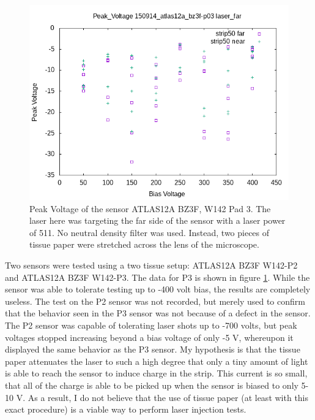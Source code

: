 \documentclass{report}
\begin{document}
            \begin{figure}[h] 
                \includegraphics[height=.4\textheight]{Peak_Voltage__150914_atlas12a_bz3f-p03__laser_far}
                \centering
                \caption{ Peak Voltage of the sensor ATLAS12A BZ3F, W142 Pad 3. The laser here was targeting the far side of the sensor with a laser power of 511. No neutral density filter was used. Instead, two pieces of tissue paper were stretched across the lens of the microscope. }
                \label{fig:Peak_Voltage__150914_atlas12a_bz3f-p03__laser_far}
            \end{figure}

            Two sensors were tested using a two tissue setup: ATLAS12A BZ3F W142-P2 and ATLAS12A BZ3F W142-P3. The data for P3 is shown in figure \ref{fig:Peak_Voltage__150914_atlas12a_bz3f-p03__laser_far}. While the sensor was able to tolerate testing up to -400 volt bias, the results are completely useless. The test on the P2 sensor was not recorded, but merely used to confirm that the behavior seen in the P3 sensor was not because of a defect in the sensor. The P2 sensor was capable of tolerating laser shots up to -700 volts, but peak voltages stopped increasing beyond a bias voltage of only -5 V, whereupon it displayed the same behavior as the P3 sensor. My hypothesis is that the tissue paper attenuates the laser to such a high degree that only a tiny amount of light is able to reach the sensor to induce charge in the strip. This current is so small, that all of the charge is able to be picked up when the sensor is biased to only 5-10 V. As a result, I do not believe that the use of tissue paper (at least with this exact procedure) is a viable way to perform laser injection tests.
\end{document}
